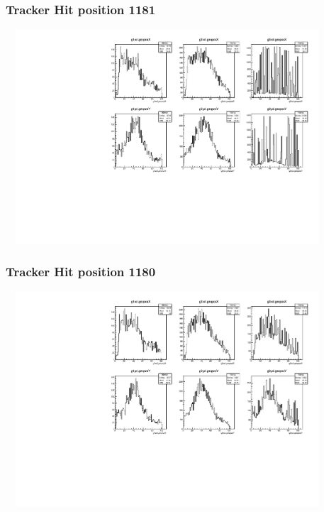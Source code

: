 \documentclass[slidestop,compress,mathserif]{beamer}
\begin{document}
\begin{frame}\frametitle{Tracker Hit position 1181}
	 \includegraphics[width=12cm,height=8cm]{Tracker_Hit_position_1181.pdf}
\end{frame}
\begin{frame}\frametitle{Tracker Hit position 1180}
	 \includegraphics[width=12cm,height=8cm]{Tracker_Hit_position_1180.pdf}
\end{frame}
\end{document}
